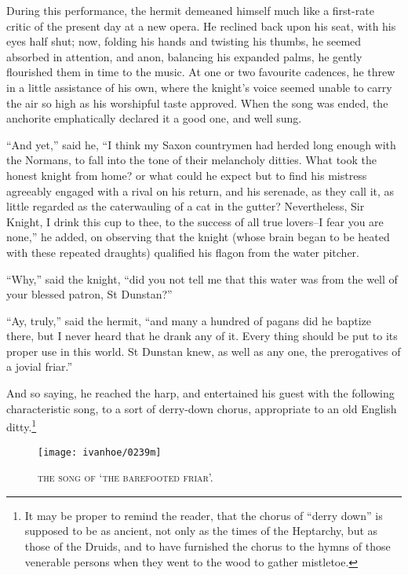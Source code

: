 During this performance, the hermit demeaned himself much like a
first-rate critic of the present day at a new opera. He reclined back
upon his seat, with his eyes half shut; now, folding his hands and
twisting his thumbs, he seemed absorbed in attention, and anon,
balancing his expanded palms, he gently flourished them in time to the
music. At one or two favourite cadences, he threw in a little assistance
of his own, where the knight's voice seemed unable to carry the air so
high as his worshipful taste approved. When the song was ended, the
anchorite emphatically declared it a good one, and well sung.

``And yet,'' said he, ``I think my Saxon countrymen had herded long
enough with the Normans, to fall into the tone of their melancholy
ditties. What took the honest knight from home? or what could he expect
but to find his mistress agreeably engaged with a rival on his return,
and his serenade, as they call it, as little regarded as the
caterwauling of a cat in the gutter? Nevertheless, Sir Knight, I drink
this cup to thee, to the success of all true lovers--I fear you are
none,'' he added, on observing that the knight (whose brain began to be
heated with these repeated draughts) qualified his flagon from the water
pitcher.

``Why,'' said the knight, ``did you not tell me that this water was from
the well of your blessed patron, St Dunstan?''

``Ay, truly,'' said the hermit, ``and many a hundred of pagans did he
baptize there, but I never heard that he drank any of it. Every thing
should be put to its proper use in this world. St Dunstan knew, as well
as any one, the prerogatives of a jovial friar.''

And so saying, he reached the harp, and entertained his guest with the
following characteristic song, to a sort of derry-down chorus,
appropriate to an old English ditty.\footnote{It may be proper to remind
the reader, that the chorus
of ``derry down'' is supposed to be as ancient, not only as the times of
the Heptarchy, but as those of the Druids, and to have furnished the
chorus to the hymns of those venerable persons when they went to the
wood to gather mistletoe.}

\begin{figure}
    \centering
    \texttt{[image: ivanhoe/0239m]}
    \caption{\scshape{the song of `the barefooted friar'.}}
\end{figure}

